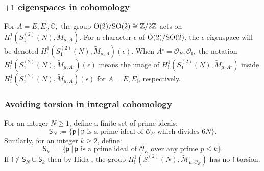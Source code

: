 \documentclass[11pt]{amsart}
\newcommand{\Z}{\mathbb Z}
\newcommand{\fl}{\mathfrak l}
\newcommand{\fp}{\mathfrak p}
\begin{document}
\subsubsection{$\pm 1$ eigenspaces in cohomology}
For $A = E, E_\mathfrak{l}, \mathbb{C},$ the group ${\rm O}(2)/ {\rm SO}(2) \cong \Z/2\Z$ 
acts on $H^1_!(S^{(2)}_1(N),\widetilde{M}_{\mu,A}).$ For a character $\epsilon$ of ${\rm O}(2)/ {\rm SO}(2)$, the 
$\epsilon$-eigenspace  
will be denoted $H^1_!(S^{(2)}_1(N),\widetilde{M}_{\mu,A})(\epsilon)$. 
When $A{^\circ} = \mathcal{O}_E, \mathcal{O}_\mathfrak{l},$ the notation $H^1_!(S^{(2)}_1(N),\widetilde{M}_{\mu,A{^\circ}})(\epsilon)$ 
means the image of $H^1_!(S^{(2)}_1(N),\widetilde{M}_{\mu,A{^\circ}})$ inside 
$H^1_!(S^{(2)}_1(N),\widetilde{M}_{\mu,A})(\epsilon)$ for $A =E, E_\mathfrak{l}$, respectively.

\subsubsection{Avoiding torsion in integral cohomology}
\label{sec:avoiding-torsion}
For an integer $N \geq 1$, define a finite set of prime ideals: 
\begin{equation}
\mathsf{S}_N := \{ \mathfrak{p} \ |\  \mbox{$\fp$ is a prime ideal of $\mathcal{O}_E$ which divides $6N$} \}.
\end{equation}
Similarly, for an integer $k \geq 2$, define: 
\begin{equation}
\mathsf{S}_{k} \:= \ \{ \mathfrak{p} \ |\  \mbox{$\fp$ is a prime ideal of $\mathcal{O}_E$ over any prime $p \leq k$} \}.
\end{equation}
 If $\fl \not\in \mathsf{S}_N \cup \mathsf{S}_{k}$ then by 
Hida \cite[($1.14_b$)]{h81a}, the group 
$H^1_!(S_1^{(2)}(N), \widetilde{\mathcal{M}}_{\mu,\mathcal{O}_E})$ has no $\fl$-torsion. 


\end{document}
